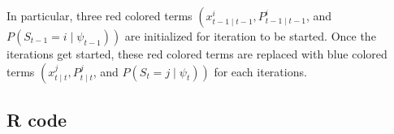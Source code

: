 \documentclass[UTF8,12pt]{ctexart}
\numberwithin{equation}{section}%
\begin{document}
	In particular, three red colored terms $\left(x_{t-1 \mid t-1}^i, P_{t-1 \mid t-1}^i\right.$, and $\left.P\left(S_{t-1}=i \mid \psi_{t-1}\right)\right)$ are initialized for iteration to be started. Once the iterations get started, these red colored terms are replaced with blue colored terms $\left(x_{t \mid t}^j, P_{t \mid t}^j\right.$, and $\left.P\left(S_t=j \mid \psi_t\right)\right)$ for each iterations.
	

	\newpage
	\begin{appendices}
		\section{R code}

		
	\end{appendices}
	
	\newpage
\end{document}

